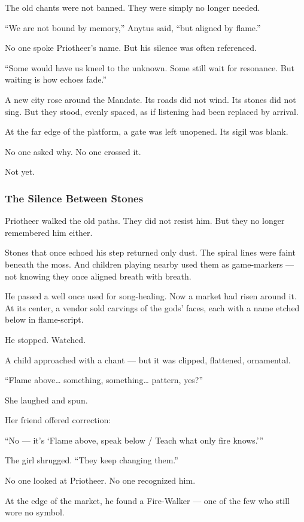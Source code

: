 \documentclass[12pt]{article}
\begin{document}
The old chants were not banned.  
They were simply no longer needed.

 “We are not bound by memory,” Anytus said,  
 “but aligned by flame.”

No one spoke Priotheer’s name.  
But his silence was often referenced.

 “Some would have us kneel to the unknown.  
 Some still wait for resonance.  
 But waiting is how echoes fade.”

A new city rose around the Mandate.  
Its roads did not wind.  
Its stones did not sing.  
But they stood, evenly spaced, as if listening had been replaced by arrival.

At the far edge of the platform, a gate was left unopened.  
Its sigil was blank.

No one asked why.  
No one crossed it.

Not yet.


\dotfill

\subsubsection{The Silence Between Stones}

Priotheer walked the old paths.  
They did not resist him.  
But they no longer remembered him either.

Stones that once echoed his step returned only dust.  
The spiral lines were faint beneath the moss.  
And children playing nearby used them as game-markers —  
not knowing they once aligned breath with breath.

He passed a well once used for song-healing.  
Now a market had risen around it.  
At its center, a vendor sold carvings of the gods’ faces,  
each with a name etched below in flame-script.

He stopped.  
Watched.

A child approached with a chant —  
but it was clipped, flattened, ornamental.

 “Flame above… something, something… pattern, yes?”

She laughed and spun.

Her friend offered correction:

 “No — it’s ‘Flame above, speak below / Teach what only fire knows.’”

The girl shrugged.  
 “They keep changing them.”

No one looked at Priotheer.  
No one recognized him.

At the edge of the market, he found a Fire-Walker — one of the few who still wore no symbol.
\end{document}
